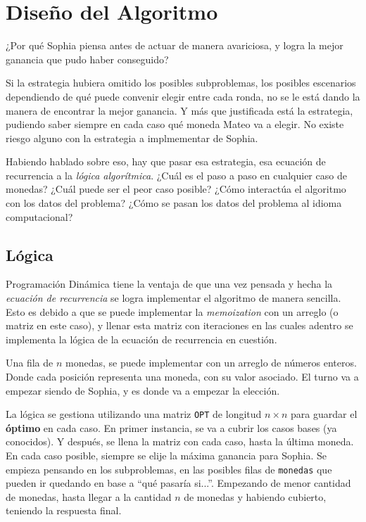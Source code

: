 \section{Diseño del Algoritmo}

¿Por qué Sophia piensa antes de actuar de manera avariciosa, y logra la mejor ganancia que pudo haber conseguido?

Si la estrategia hubiera omitido los posibles subproblemas, los posibles escenarios dependiendo de qué puede convenir elegir entre cada ronda, no se le está dando la manera de encontrar la mejor ganancia. Y más que justificada está la estrategia, pudiendo saber siempre en cada caso qué moneda Mateo va a elegir. No existe riesgo alguno con la estrategia a implmementar de Sophia.

Habiendo hablado sobre eso, hay que pasar esa estrategia, esa ecuación de recurrencia a la \textit{lógica algorítmica}. 
¿Cuál es el paso a paso en cualquier caso de monedas? ¿Cuál puede ser el peor caso posible? ¿Cómo interactúa el algoritmo con los datos del problema? ¿Cómo se pasan los datos del problema al idioma computacional?

\subsection{Lógica}

Programación Dinámica tiene la ventaja de que una vez pensada y hecha la \textit{ecuación de recurrencia} se logra implementar el algoritmo de manera sencilla.
Esto es debido a que se puede implementar la \textit{memoization} con un arreglo (o matriz en este caso), y llenar esta matriz con iteraciones en las cuales adentro se implementa la lógica de la ecuación de recurrencia en cuestión.

Una fila de $n$ monedas, se puede implementar con un arreglo de números enteros. Donde cada posición representa una moneda, con su valor asociado.
El turno va a empezar siendo de Sophia, y es donde va a empezar la elección. 

La lógica se gestiona utilizando una matriz \texttt{OPT} de longitud $n \times n$ para guardar el \textbf{óptimo} en cada caso. 
En primer instancia, se va a cubrir los casos bases (ya conocidos).
Y después, se llena la matriz con cada caso, hasta la última moneda. En cada caso posible, siempre se elije la máxima ganancia para Sophia.
Se empieza pensando en los subproblemas, en las posibles filas de \texttt{monedas} que pueden ir quedando en base a ``qué pasaría si...''. Empezando de menor cantidad de monedas, hasta llegar a la cantidad $n$ de monedas y habiendo cubierto, teniendo la respuesta final.

